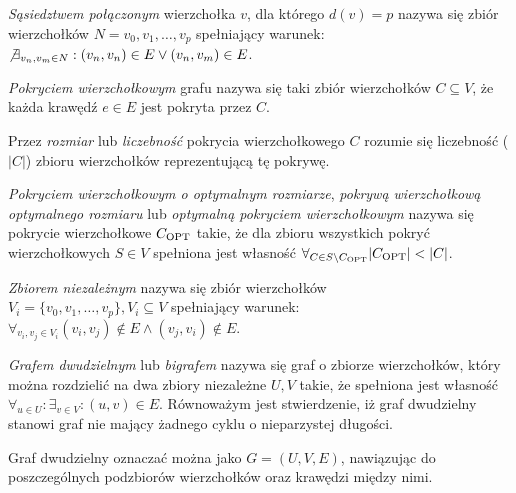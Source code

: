 \begin{definition}
  \emph{Sąsiedztwem połączonym} wierzchołka $v$, dla którego $d(v)=p$ nazywa się zbiór wierzchołków 
  $N={v_0, v_1, \ldots, v_p}$ spełniający warunek:\\
  $\not \exists_{v_n, v_m \in N}:{(v_n,v_n) \in E \lor (v_n,v_m) \in E}$.
\end{definition}

\begin{definition}
  \emph{Pokryciem wierzchołkowym} grafu nazywa się taki zbiór wierzchołków
  $C \subseteq V$, że każda krawędź $e \in E$ jest pokryta przez $C$.
\end{definition}

\begin{definition}
  Przez \emph{rozmiar} lub \emph{liczebność} pokrycia wierzchołkowego $C$ rozumie się liczebność ($|C|$)
  zbioru wierzchołków reprezentującą tę pokrywę.
\end{definition}

\begin{definition}
  \emph{Pokryciem wierzchołkowym o optymalnym rozmiarze}, \emph{pokrywą 
  wierzchołkową optymalnego rozmiaru} lub \emph{optymalną pokryciem wierzchołkowym} 
  nazywa się pokrycie wierzchołkowe $C_{\textnormal{OPT}}$ takie, że dla zbioru wszystkich pokryć wierzchołkowych $S \in V$ spełniona jest własność $\forall_{C \in S \setminus C_{\textnormal{OPT}}}{|C_{\textnormal{OPT}}| < |C|}$.
\end{definition}

\begin{definition}
  \emph{Zbiorem niezależnym} nazywa się zbiór wierzchołków\\
  $V_i=\{v_0, v_1, \ldots, v_p \}, V_i \subseteq V$ spełniający warunek:
  $\forall_{v_i, v_j \in V_i}{(v_i, v_j) \notin E \land (v_j, v_i) \notin E}$.
\end{definition}

\begin{definition}
  \emph{Grafem dwudzielnym} lub \emph{bigrafem} nazywa się graf o zbiorze 
  wierzchołków, który można rozdzielić na dwa zbiory niezależne $U, V$ takie, że spełniona jest własność
  $\forall_{u \in U}: \exists_{v \in V}: (u,v) \in E$.
  Równoważym jest stwierdzenie, iż graf dwudzielny stanowi graf nie mający
  żadnego cyklu o nieparzystej długości.

  Graf dwudzielny oznaczać można jako $G=(U,V,E)$, nawiązując do poszczególnych
  podzbiorów wierzchołków oraz krawędzi między nimi.
\end{definition}

